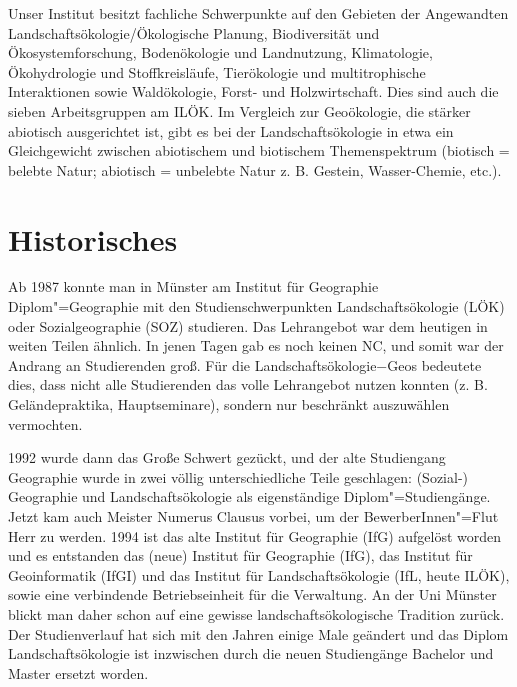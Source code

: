 Unser Institut besitzt fachliche Schwerpunkte auf den Gebieten der Angewandten Landschaftsökologie/Ökologische Planung, Biodiversität und Ökosystemforschung, Bodenökologie und Landnutzung, Klimatologie, Ökohydrologie und Stoffkreisläufe, Tierökologie und multitrophische Interaktionen sowie Waldökologie, Forst- und Holzwirtschaft. Dies sind auch die sieben Arbeitsgruppen am ILÖK. Im Vergleich zur Geoökologie, die stärker abiotisch ausgerichtet ist, gibt es bei der Landschaftsökologie in etwa ein Gleichgewicht zwischen abiotischem und biotischem Themenspektrum (biotisch = belebte Natur; abiotisch = unbelebte Natur z. B. Gestein, Wasser-Chemie, etc.).

\section*{Historisches}
Ab 1987 konnte man in Münster am Institut für Geographie Diplom"=Geographie mit den Studienschwerpunkten Landschaftsökologie (LÖK) oder Sozialgeographie (SOZ) studieren. Das Lehrangebot war dem heutigen in weiten Teilen ähnlich. In jenen Tagen gab es noch keinen NC, und somit war der Andrang an Studierenden groß. Für die Landschaftsökologie−Geos bedeutete dies, dass nicht alle Studierenden das volle Lehrangebot nutzen konnten (z. B. Geländepraktika, Hauptseminare), sondern nur beschränkt auszuwählen vermochten.

1992 wurde dann das Große Schwert gezückt, und der alte Studiengang Geographie wurde in zwei völlig unterschiedliche Teile geschlagen: (Sozial-) Geographie und Landschaftsökologie als eigenständige Diplom"=Studiengänge. Jetzt kam auch Meister Numerus Clausus vorbei, um der BewerberInnen"=Flut Herr zu werden. 1994 ist das alte Institut für Geographie (IfG) aufgelöst worden und es entstanden das (neue) Institut für Geographie (IfG), das Institut für Geoinformatik (IfGI) und das Institut für Landschaftsökologie (IfL, heute ILÖK), sowie eine verbindende Betriebseinheit für die Verwaltung.
An der Uni Münster blickt man daher schon auf eine gewisse landschaftsökologische Tradition zurück. Der Studienverlauf hat sich mit den Jahren einige Male geändert und das Diplom Landschaftsökologie ist inzwischen durch die neuen Studiengänge Bachelor und Master ersetzt worden.

